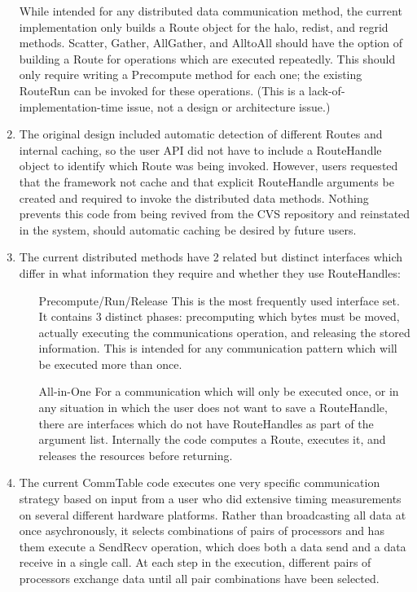 \begin{enumerate}
While intended for any distributed data communication method,
the current implementation only builds a Route object for
the halo, redist, and regrid methods.  Scatter, Gather,
AllGather, and AlltoAll 
should have the option of building a Route for operations
which are executed repeatedly.  This should only require
writing a Precompute method for each one; the existing 
RouteRun can be invoked for these operations.
(This is a lack-of-implementation-time issue, not a design
or architecture issue.)

\item

The original design included automatic detection of different
Routes and internal caching, so the user API did not have to
include a RouteHandle object to identify which Route was
being invoked.  However, users requested that the framework
not cache and that explicit RouteHandle arguments be created
and required to invoke the distributed data methods.
Nothing prevents this code from being revived from the CVS
repository and reinstated in the system, should automatic
caching be desired by future users.

\item

The current distributed methods have 2 related but distinct
interfaces which differ in what information they require
and whether they use RouteHandles:

\begin{enumerate}
\item[Precompute/Run/Release]
This is the most frequently used interface set.
It contains 3 distinct phases: precomputing which bytes must
be moved, actually executing the communications operation,
and releasing the stored information.  This is intended for
any communication pattern which will be executed more than once.
\item[All-in-One]
For a communication which will only be executed once, or in
any situation in which the user does not want to save a RouteHandle,
there are interfaces which do not have RouteHandles as part of
the argument list.  Internally the code computes a Route,
executes it, and releases the resources before returning.
\end{enumerate}

\item

The current CommTable code executes one very specific communication
strategy based on input from a user who did extensive timing
measurements on several different hardware platforms.  Rather than
broadcasting all data at once asychronously, it selects combinations
of pairs of processors and has them execute a SendRecv operation, which
does both a data send and a data receive in a single call.
At each step in the execution, different pairs of processors
exchange data until all pair combinations have been selected.


\end{enumerate}

